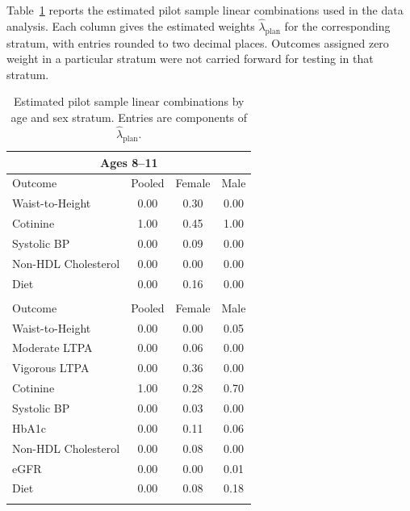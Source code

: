 \documentclass[12pt,leqno,titlepage]{amsart}
\newcommand{\1}{\mathbbm{1}}
\begin{document}
\begin{bibunit}
Table~\ref{tab:estimated-lambdas} reports the estimated pilot sample linear
combinations used in the data analysis. Each column gives the estimated weights
$\widehat{\lambda}_{\mathrm{plan}}$ for the corresponding stratum, with
entries rounded to two decimal places. Outcomes assigned zero weight in a particular stratum were not
carried forward for testing in that stratum.

\begin{table}[htbp]
\centering
\caption{Estimated pilot sample linear combinations by age and sex stratum. Entries are components of $\widehat{\lambda}_{\mathrm{plan}}$.}
\label{tab:estimated-lambdas}
\footnotesize
\begin{tabular}{lccc}
\multicolumn{4}{c}{{Ages 8--11}}\\
\midrule
Outcome & Pooled & Female & Male \\
\midrule
Waist-to-Height       & 0.00 & 0.30 & 0.00 \\
Cotinine              & 1.00 & 0.45 & 1.00 \\
Systolic BP           & 0.00 & 0.09 & 0.00 \\
Non-HDL Cholesterol   & 0.00 & 0.00 & 0.00 \\
Diet                  & 0.00 & 0.16 & 0.00 \\
\midrule \addlinespace[1.5em]
\multicolumn{4}{c}{{Ages 12--17}}\\
\midrule
Outcome & Pooled & Female & Male \\
\midrule
Waist-to-Height       & 0.00 & 0.00 & 0.05 \\
Moderate LTPA         & 0.00 & 0.06 & 0.00 \\
Vigorous LTPA         & 0.00 & 0.36 & 0.00 \\
Cotinine              & 1.00 & 0.28 & 0.70 \\
Systolic BP           & 0.00 & 0.03 & 0.00 \\
HbA1c                 & 0.00 & 0.11 & 0.06 \\
Non-HDL Cholesterol   & 0.00 & 0.08 & 0.00 \\
eGFR                  & 0.00 & 0.00 & 0.01 \\
Diet                  & 0.00 & 0.08 & 0.18 \\
\bottomrule
\vspace{2em}
\end{tabular}
\end{table}


\end{bibunit}
\end{document}

